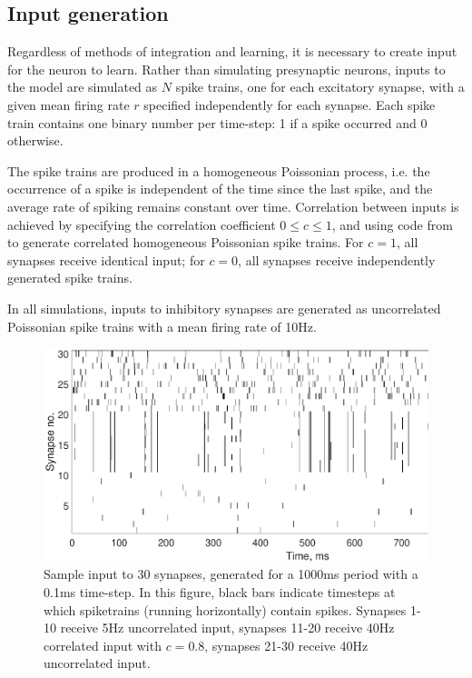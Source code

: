 \documentclass[a4paper,12pt]{report}
\theoremstyle{definition}
\begin{document}
\subsection{Input generation}

Regardless of methods of integration and learning, it is necessary to create input for the neuron to learn. Rather than simulating presynaptic neurons, inputs to the model are simulated as $N$ spike trains, one for each excitatory synapse, with a given mean firing rate $r$ specified independently for each synapse. Each spike train contains one binary number per time-step: 1 if a spike occurred and 0 otherwise.

The spike trains are produced in a homogeneous Poissonian process, i.e. the occurrence of a spike is independent of the time since the last spike, and the average rate of spiking remains constant over time.
Correlation between inputs is achieved by specifying the correlation coefficient $0 \leq c \leq 1$, and using code from \cite{macke2009} to generate correlated homogeneous Poissonian spike trains. For $c=1$, all synapses receive identical input; for $c=0$, all synapses receive independently generated spike trains.

In all simulations, inputs to inhibitory synapses are generated as uncorrelated Poissonian spike trains with a mean firing rate of 10Hz.


\begin{figure}[h]
    \includegraphics[width=\textwidth]{figures/methods_sample_input.eps}
    \caption{Sample input to 30 synapses, generated for a 1000ms period with a 0.1ms time-step. In this figure, black bars indicate timesteps at which spiketrains (running horizontally) contain spikes. Synapses 1-10 receive 5Hz uncorrelated input, synapses 11-20 receive 40Hz correlated input with $c=0.8$, synapses 21-30 receive 40Hz uncorrelated input.}
    \label{fig:methods_sample_input}
\end{figure}
\end{document}
